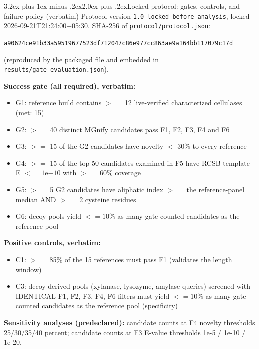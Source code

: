 \documentclass[11pt]{article}
\makeatletter
\renewcommand{\section}{\@startsection{section}{1}{\z@}%
  {3.2ex plus 1ex minus .2ex}{2.0ex plus .2ex}{\Large\bfseries\color{navy}}}
\makeatother
\begin{document}
\clearpage
\appendix
\renewcommand{\thesection}{Appendix \Alph{section}}
\renewcommand{\thetable}{\Alph{section}.\arabic{table}}
\setcounter{table}{0}

\section{Locked protocol: gates, controls, and failure policy (verbatim)}
Protocol version \texttt{1.0-locked-before-analysis}, locked 2026-09-21T21:24:00+05:30. SHA-256 of \texttt{protocol/protocol.json}:
\begin{center}\small\texttt{a90624ce91b33a59519677523df712047c86e977cc863ae9a164bb117079c17d}\end{center}
(reproduced by the packaged file and embedded in \texttt{results/gate\_evaluation.json}).

\textbf{Success gate (all required), verbatim:}
\begin{itemize}
\item G1: reference build contains $>=$ 12 live-verified characterized cellulases (met: 15)
\item G2: $>=$ 40 distinct MGnify candidates pass F1, F2, F3, F4 and F6
\item G3: $>=$ 15 of the G2 candidates have novelty $<$ 30\% to every reference
\item G4: $>=$ 15 of the top-50 candidates examined in F5 have RCSB template E $<= 1\mathrm{e}{-10}$ with $>=$ 60\% coverage
\item G5: $>=$ 5 G2 candidates have aliphatic index $>=$ the reference-panel median AND $>=$ 2 cysteine residues
\item G6: decoy pools yield $<= 10\%$ as many gate-counted candidates as the reference pool
\end{itemize}

\textbf{Positive controls, verbatim:}
\begin{itemize}
\item C1: $>=$ 85\% of the 15 references must pass F1 (validates the length window)
\item C3: decoy-derived pools (xylanase, lysozyme, amylase queries) screened with IDENTICAL F1, F2, F3, F4, F6 filters must yield $<= 10\%$ as many gate-counted candidates as the reference pool (specificity)
\end{itemize}

\textbf{Sensitivity analyses (predeclared):} candidate counts at F4 novelty thresholds 25/30/35/40 percent; candidate counts at F3 E-value thresholds 1e-5 / 1e-10 / 1e-20.
\end{document}
